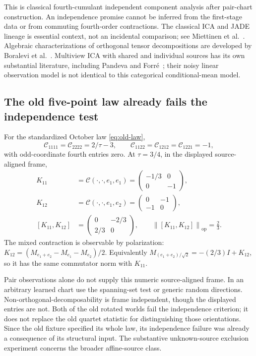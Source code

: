 \documentclass[11pt]{article}
\theoremstyle{definition}
\theoremstyle{remark}
\newcommand{\op}{\mathrm{op}}
\newcommand{\norm}[1]{\left\lVert#1\right\rVert}
\begin{document}
This is classical fourth-cumulant independent component analysis after
pair-chart construction. An independence promise cannot be inferred from
the first-stage data or from commuting fourth-order contractions. The
classical ICA and JADE lineage is essential context, not an incidental
comparison; see Miettinen et al.~\cite{miettinen}. Algebraic
characterizations of orthogonal tensor decompositions are developed by
Boralevi et al.~\cite{boralevi}. Multiview ICA with shared and individual
sources has its own substantial literature, including
Pandeva and Forr\'e~\cite{pandeva}; their noisy linear observation model
is not identical to this categorical conditional-mean model.

\subsection{The old five-point law already fails the independence test}

For the standardized October law \eqref{eq:old-law},
\[
\mathcal C_{1111}=\mathcal C_{2222}=2/\tau-3,
\qquad
\mathcal C_{1122}=\mathcal C_{1212}=\mathcal C_{1221}=-1,
\]
with odd-coordinate fourth entries zero. At $\tau=3/4$, in the displayed
source-aligned frame,
\begin{align}
K_{11}&=\mathcal C(\cdot,\cdot,e_1,e_1)
=\begin{pmatrix}-1/3&0\\0&-1\end{pmatrix},\nonumber\\
K_{12}&=\mathcal C(\cdot,\cdot,e_1,e_2)
=\begin{pmatrix}0&-1\\-1&0\end{pmatrix},\nonumber\\
[K_{11},K_{12}]&=\begin{pmatrix}0&-2/3\\2/3&0\end{pmatrix},
\qquad \norm{[K_{11},K_{12}]}_{\op}=\frac23.
\label{eq:old-commutator}
\end{align}
The mixed contraction is observable by polarization:
$K_{12}=(M_{e_1+e_2}-M_{e_1}-M_{e_2})/2$.
Equivalently $M_{(e_1+e_2)/\sqrt2}=-(2/3)I+K_{12}$, so it has the
same commutator norm with $K_{11}$.

Pair observations alone do not supply this numeric source-aligned frame.
In an arbitrary learned chart use the spanning-set test or generic
random directions. Non-orthogonal-decomposability is frame independent,
though the displayed entries are not. Both of the old rotated worlds
fail the independence criterion; it does not replace the old quartet
statistic for distinguishing those orientations. Since the old fixture
specified its whole law, its independence failure was already a
consequence of its structural input. The substantive unknown-source
exclusion experiment concerns the broader affine-source class.
\end{document}
